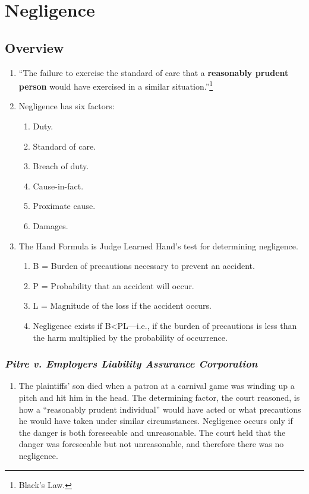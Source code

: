 \section{Negligence}

\subsection{Overview}

\begin{enumerate}
    \item ``The failure to exercise the standard of care that a \textbf{reasonably prudent person} would have exercised in a similar situation.''\footnote{Black's Law.}
    \item Negligence has six factors:
    \begin{enumerate}
        \item Duty.
        \item Standard of care.
        \item Breach of duty.
        \item Cause-in-fact.
        \item Proximate cause.
        \item Damages.
    \end{enumerate}
    \item The Hand Formula is Judge Learned Hand's test for determining negligence.
    \begin{enumerate}
        \item B = Burden of precautions necessary to prevent an accident.
        \item P = Probability that an accident will occur.
        \item L = Magnitude of the loss if the accident occurs.
        \item Negligence exists if B\textless PL---i.e., if the burden of precautions is less than the harm multiplied by the probability of occurrence.
    \end{enumerate}
\end{enumerate}

\subsubsection{\emph{Pitre v. Employers Liability Assurance Corporation}}

\begin{enumerate}
    \item The plaintiffs' son died when a patron at a carnival game was winding up a pitch and hit him in the head. The determining factor, the court reasoned, is how a ``reasonably prudent individual'' would have acted or what precautions he would have taken under similar circumstances. Negligence occurs only if the danger is both foreseeable and unreasonable. The court held that the danger was foreseeable but not unreasonable, and therefore there was no negligence.
\end{enumerate}

